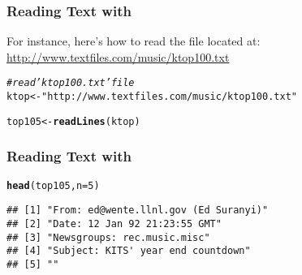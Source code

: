 \documentclass[12pt]{beamer}\usepackage[]{graphicx}\usepackage[]{color}
\makeatletter
\newcommand{\hlnum}[1]{\textcolor[rgb]{0.686,0.059,0.569}{#1}}%
\newcommand{\hlstr}[1]{\textcolor[rgb]{0.192,0.494,0.8}{#1}}%
\newcommand{\hlcom}[1]{\textcolor[rgb]{0.678,0.584,0.686}{\textit{#1}}}%
\newcommand{\hlstd}[1]{\textcolor[rgb]{0.345,0.345,0.345}{#1}}%
\newcommand{\hlkwb}[1]{\textcolor[rgb]{0.69,0.353,0.396}{#1}}%
\newcommand{\hlkwc}[1]{\textcolor[rgb]{0.333,0.667,0.333}{#1}}%
\newcommand{\hlkwd}[1]{\textcolor[rgb]{0.737,0.353,0.396}{\textbf{#1}}}%
\newenvironment{kframe}{%
 \def\at@end@of@kframe{}%
 \ifinner\ifhmode%
  \def\at@end@of@kframe{\end{minipage}}%
  \begin{minipage}{\columnwidth}%
 \fi\fi%
 \def\FrameCommand##1{\hskip\@totalleftmargin \hskip-\fboxsep
 \colorbox{shadecolor}{##1}\hskip-\fboxsep
     \hskip-\linewidth \hskip-\@totalleftmargin \hskip\columnwidth}%
 \MakeFramed {\advance\hsize-\width
   \@totalleftmargin\z@ \linewidth\hsize
   \@setminipage}}%
 {\par\unskip\endMakeFramed%
 \at@end@of@kframe}
\newenvironment{knitrout}{}{} %
\makeatother
\begin{document}

\begin{frame}[fragile]
\frametitle{Reading Text with }

For instance, here's how to read the file located at: \\
\url{http://www.textfiles.com/music/ktop100.txt}



\begin{knitrout}\footnotesize
{}\color{fgcolor}\begin{kframe}
\begin{alltt}
\hlcom{# read 'ktop100.txt' file}
\hlstd{ktop} \hlkwb{<-} \hlstr{"http://www.textfiles.com/music/ktop100.txt"}

\hlstd{top105} \hlkwb{<-} \hlkwd{readLines}\hlstd{(ktop)}
\end{alltt}
\end{kframe}
\end{knitrout}
  
\end{frame}


\begin{frame}[fragile]
\frametitle{Reading Text with }

\begin{knitrout}\footnotesize
{}\color{fgcolor}\begin{kframe}
\begin{alltt}
\hlkwd{head}\hlstd{(top105,} \hlkwc{n} \hlstd{=} \hlnum{5}\hlstd{)}
\end{alltt}
\begin{verbatim}
## [1] "From: ed@wente.llnl.gov (Ed Suranyi)"
## [2] "Date: 12 Jan 92 21:23:55 GMT"        
## [3] "Newsgroups: rec.music.misc"          
## [4] "Subject: KITS' year end countdown"   
## [5] ""
\end{verbatim}
\end{kframe}
\end{knitrout}
  
\end{frame}


\begin{frame}
\begin{center}
\Huge{}
\end{center}
\end{frame}
\end{document}

